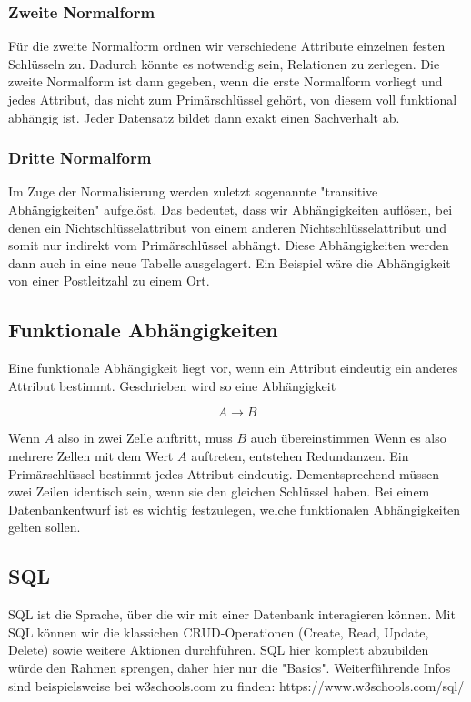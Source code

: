 \documentclass{article}
\begin{document}
	\subsubsection{Zweite Normalform}
	Für die zweite Normalform ordnen wir verschiedene Attribute einzelnen festen Schlüsseln zu. Dadurch könnte es notwendig sein, Relationen zu zerlegen. Die zweite Normalform ist dann gegeben, wenn die erste Normalform vorliegt und jedes Attribut, das nicht zum Primärschlüssel gehört, von diesem voll funktional abhängig ist. Jeder Datensatz bildet dann exakt einen Sachverhalt ab.

	\subsubsection{Dritte Normalform}
	Im Zuge der Normalisierung werden zuletzt sogenannte "transitive Abhängigkeiten" aufgelöst. Das bedeutet, dass wir Abhängigkeiten auflösen, bei denen ein Nichtschlüsselattribut von einem anderen Nichtschlüsselattribut und somit nur indirekt vom Primärschlüssel abhängt. Diese Abhängigkeiten werden dann auch in eine neue Tabelle ausgelagert. Ein Beispiel wäre die Abhängigkeit von einer Postleitzahl zu einem Ort.

	\subsection{Funktionale Abhängigkeiten}
	Eine funktionale Abhängigkeit liegt vor, wenn ein Attribut eindeutig ein anderes Attribut bestimmt. Geschrieben wird so eine Abhängigkeit

	\begin{equation*}
		A \rightarrow B
	\end{equation*}

	Wenn $A$ also in zwei Zelle auftritt, muss $B$ auch übereinstimmen
	Wenn es also mehrere Zellen mit dem Wert $A$ auftreten, entstehen Redundanzen. Ein Primärschlüssel bestimmt jedes Attribut eindeutig. Dementsprechend müssen zwei Zeilen identisch sein, wenn sie den gleichen Schlüssel haben. Bei einem Datenbankentwurf ist es wichtig festzulegen, welche funktionalen Abhängigkeiten gelten sollen.

	\subsection{SQL}
	SQL ist die Sprache, über die wir mit einer Datenbank interagieren können. Mit SQL können wir die klassichen CRUD-Operationen (Create, Read, Update, Delete) sowie weitere Aktionen durchführen. SQL hier komplett abzubilden würde den Rahmen sprengen, daher hier nur die "Basics". Weiterführende Infos sind beispielsweise bei w3schools.com zu finden: https://www.w3schools.com/sql/
\end{document}
